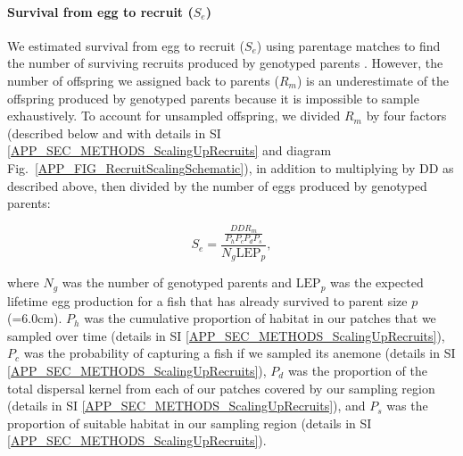 \documentclass[12pt, oneside]{article}   	%
\begin{document}
\paragraph*{Survival from egg to recruit ($S_e$)}

We estimated survival from egg to recruit ($S_e$) using parentage matches to find the number of surviving recruits produced by genotyped parents \citep[similar to][]{johnson2018integrating}. However, the number of offspring we assigned back to parents ($R_m$) is an underestimate of the offspring produced by genotyped parents because it is impossible to sample exhaustively. To account for unsampled offspring, we divided $R_m$ by four factors (described below and with details in SI \ref{APP_SEC_METHODS_ScalingUpRecruits} and diagram Fig.\ \ref{APP_FIG_RecruitScalingSchematic}), in addition to multiplying by $\text{DD}$ as described above, then divided by the number of eggs produced by genotyped parents:

\begin{equation}
S_e = \frac{\frac{DD R_m}{P_h P_c P_d P_s}}{N_g \text{LEP}_p}, \label{EQN_EggRecruitSurv}
\end{equation}

where $N_g$ was the number of genotyped parents and $\text{LEP}_p$ was the expected lifetime egg production for a fish that has already survived to parent size $p$ (=6.0cm). $P_h$ was the cumulative proportion of habitat in our patches that we sampled over time (details in SI \ref{APP_SEC_METHODS_ScalingUpRecruits}), $P_c$ was the probability of capturing a fish if we sampled its anemone (details in SI \ref{APP_SEC_METHODS_ScalingUpRecruits}), $P_d$ was the proportion of the total dispersal kernel from each of our patches covered by our sampling region (details in SI \ref{APP_SEC_METHODS_ScalingUpRecruits}), and $P_s$ was the proportion of suitable habitat in our sampling region (details in SI \ref{APP_SEC_METHODS_ScalingUpRecruits}).
\end{document}

